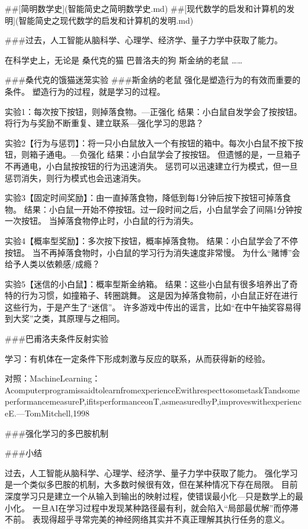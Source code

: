 ##[简明数学史](智能简史之简明数学史.md)
##[现代数学的启发和计算机的发明](智能简史之现代数学的启发和计算机的发明.md)

###过去，人工智能从脑科学、心理学、经济学、量子力学中获取了能力。


在科学史上，无论是
桑代克的猫
巴普洛夫的狗
斯金纳的老鼠
……


###桑代克的饿猫迷笼实验
###斯金纳的老鼠
强化是塑造行为的有效而重要的条件。
塑造行为的过程，就是学习的过程。

实验1：每次按下按钮，则掉落食物。---正强化
结果：小白鼠自发学会了按按钮。
将行为与奖励不断重复、建立联系---强化学习的思路？

实验2【行为与惩罚】：将一只小白鼠放入一个有按钮的箱中。每次小白鼠不按下按钮，则箱子通电。---负强化
结果：小白鼠学会了按按钮。
但遗憾的是，一旦箱子不再通电，小白鼠按按钮的行为迅速消失。
惩罚可以迅速建立行为模式，但一旦惩罚消失，则行为模式也会迅速消失。

实验3【固定时间奖励】：由一直掉落食物，降低到每1分钟后按下按钮可掉落食物。
结果：小白鼠一开始不停按钮。过一段时间之后，小白鼠学会了间隔1分钟按一次按钮。
当掉落食物停止时，小白鼠的行为消失。

实验4【概率型奖励】：多次按下按钮，概率掉落食物。
结果：小白鼠学会了不停按钮。
当不再掉落食物时，小白鼠的学习行为消失速度非常慢。
为什么“赌博”会给予人类以依赖感/成瘾？

实验5【迷信的小白鼠】：概率型斯金纳箱。
结果：这些小白鼠有很多培养出了奇特的行为习惯，如撞箱子、转圈跳舞。
这是因为掉落食物前，小白鼠正好在进行这些行为，于是产生了“迷信”。
许多游戏中传出的谣言，比如“在中午抽奖容易得到大奖”之类，其原理与之相同。



###巴甫洛夫条件反射实验

学习：有机体在一定条件下形成刺激与反应的联系，从而获得新的经验。

对照：MachineLearning：AcomputerprogramissaidtolearnfromexperienceEwithrespecttosometaskTandsomeperformancemeasureP,ifitsperformanceonT,asmeasuredbyP,improveswithexperienceE.---TomMitchell,1998


###强化学习的多巴胺机制


###小结

过去，人工智能从脑科学、心理学、经济学、量子力学中获取了能力。
强化学习是一个类似多巴胺的机制，大多数时候很有效，但在某种情况下存在局限。
目前深度学习只是建立一个从输入到输出的映射过程，使错误最小化---只是数学上的最小化。
一旦AI在学习过程中发现某种路径最有利，就会陷入“局部最优解”而停滞不前。
表现得超乎寻常完美的神经网络其实并不真正理解其执行任务的意义。


